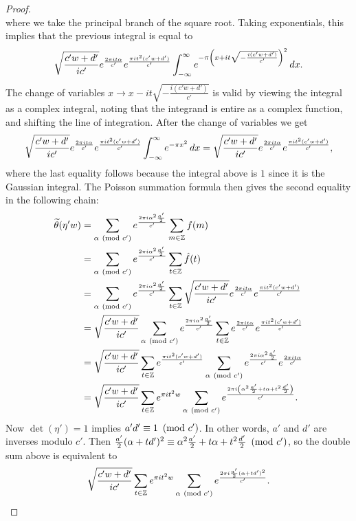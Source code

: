 \documentclass[12pt,oneside]{book}
\begin{document}
\begin{proof}
\[        \]
        where we take the principal branch of the square root. Taking exponentials, this implies that the previous integral is equal to
        \[
          \sqrt{\frac{c'w+d'}{ic'}}e^{\frac{2\pi i t\alpha}{c'}}e^{\frac{\pi it^{2}(c'w+d')}{c'}}\int_{-\infty}^{\infty}e^{-\pi\left(x+it\sqrt{-\frac{i(c'w+d')}{c'}}\right)^{2}}\,dx.
        \]
        The change of variables $x \to x-it\sqrt{-\frac{i(c'w+d')}{c'}}$ is valid by viewing the integral as a complex integral, noting that the integrand is entire as a complex function, and shifting the line of integration. After the change of variables we get
        \[
          \sqrt{\frac{c'w+d'}{ic'}}e^{\frac{2\pi i t\alpha}{c'}}e^{\frac{\pi it^{2}(c'w+d')}{c'}}\int_{-\infty}^{\infty}e^{-\pi x^{2}}\,dx = \sqrt{\frac{c'w+d'}{ic'}}e^{\frac{2\pi i t\alpha}{c'}}e^{\frac{\pi it^{2}(c'w+d')}{c'}},
        \]
        where the last equality follows because the integral above is $1$ since it is the Gaussian integral. The Poisson summation formula then gives the second equality in the following chain:
        \begin{align*}
          \widetilde{\theta}(\eta' w) &= \sum_{\alpha \ \left(\text{mod }c'\right)}e^{\frac{2\pi i\alpha^{2}\frac{a'}{2}}{c'}}\sum_{m \in \mathbb{Z}}f(m) \\
          &= \sum_{\alpha \ \left(\text{mod }c'\right)}e^{\frac{2\pi i\alpha^{2}\frac{a'}{2}}{c'}}\sum_{t \in \mathbb{Z}}\hat{f}(t) \\
          &= \sum_{\alpha \ \left(\text{mod }c'\right)}e^{\frac{2\pi i\alpha^{2}\frac{a'}{2}}{c'}}\sum_{t \in \mathbb{Z}}\sqrt{\frac{c'w+d'}{ic'}}e^{\frac{2\pi i t\alpha}{c'}}e^{\frac{\pi it^{2}(c'w+d')}{c'}} \\
          &= \sqrt{\frac{c'w+d'}{ic'}}\sum_{\alpha \ \left(\text{mod }c'\right)}e^{\frac{2\pi i\alpha^{2}\frac{a'}{2}}{c'}}\sum_{t \in \mathbb{Z}}e^{\frac{2\pi i t\alpha}{c'}}e^{\frac{\pi it^{2}(c'w+d')}{c'}} \\
          &= \sqrt{\frac{c'w+d'}{ic'}}\sum_{t \in \mathbb{Z}}e^{\frac{\pi it^{2}(c'w+d')}{c'}}\sum_{\alpha \ \left(\text{mod }c'\right)}e^{\frac{2\pi i\alpha^{2}\frac{a'}{2}}{c'}}e^{\frac{2\pi i t\alpha}{c'}} \\
          &= \sqrt{\frac{c'w+d'}{ic'}}\sum_{t \in \mathbb{Z}}e^{\pi it^{2}w}\sum_{\alpha \ \left(\text{mod }c'\right)}e^{\frac{2\pi i\left(\alpha^{2}\frac{a'}{2}+t\alpha+t^{2}\frac{d'}{2}\right)}{c'}}.
        \end{align*}
        Now $\det(\eta') = 1$ implies $a'd' \equiv 1 \ \left(\text{mod }c'\right)$. In other words, $a'$ and $d'$ are inverses modulo $c'$. Then $\frac{a'}{2}(\alpha+td')^{2} \equiv \alpha^{2}\frac{a'}{2}+t\alpha+t^{2}\frac{d'}{2} \ \left(\text{mod }c'\right)$, so the double sum above is equivalent to
        \[
          \sqrt{\frac{c'w+d'}{ic'}}\sum_{t \in \mathbb{Z}}e^{\pi it^{2}w}\sum_{\alpha \ \left(\text{mod }c'\right)}e^{\frac{2\pi i\frac{a'}{2}(\alpha+td')^{2}}{c'}}.
\]
\end{proof}
\end{document}
